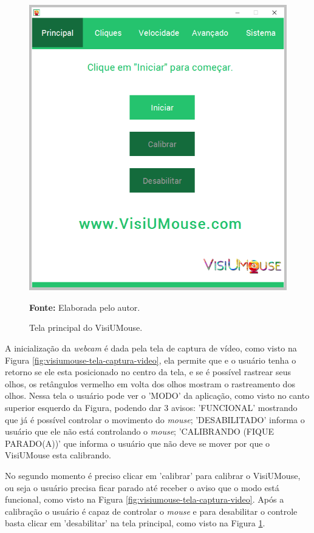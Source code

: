 \begin{figure}[H]
\caption{Tela principal do VisiUMouse.} 
\centering \includegraphics[scale=.5]{img/visiumouse-tela-principal-v216.png}

\textbf{Fonte:} Elaborada pelo autor.
\label{fig:visiumouse-tela-principal}
\end{figure}

A inicialização da \textit{webcam} é dada pela tela de captura de vídeo, como visto na Figura \ref{fig:visiumouse-tela-captura-video}, ela permite que e o usuário tenha o retorno se ele esta posicionado no centro da tela, e se é possível rastrear seus olhos, os retângulos vermelho em volta dos olhos mostram o rastreamento dos olhos. Nessa tela o usuário pode ver o 'MODO' da aplicação, como visto no canto superior esquerdo da Figura, podendo dar 3 avisos: 'FUNCIONAL' mostrando que já é possível controlar o movimento do \textit{mouse}; 'DESABILITADO' informa o usuário que ele não está controlando o \textit{mouse}; 'CALIBRANDO (FIQUE PARADO(A))' que informa o usuário que não deve se mover por que o VisiUMouse esta calibrando.

No segundo momento é preciso clicar em 'calibrar' para calibrar o VisiUMouse, ou seja o usuário precisa ficar parado até receber o aviso que o modo está funcional, como visto na Figura \ref{fig:visiumouse-tela-captura-video}. Após a calibração o usuário é capaz de controlar o \textit{mouse} e para desabilitar o controle basta clicar em 'desabilitar' na tela principal, como visto na Figura \ref{fig:visiumouse-tela-principal}.


